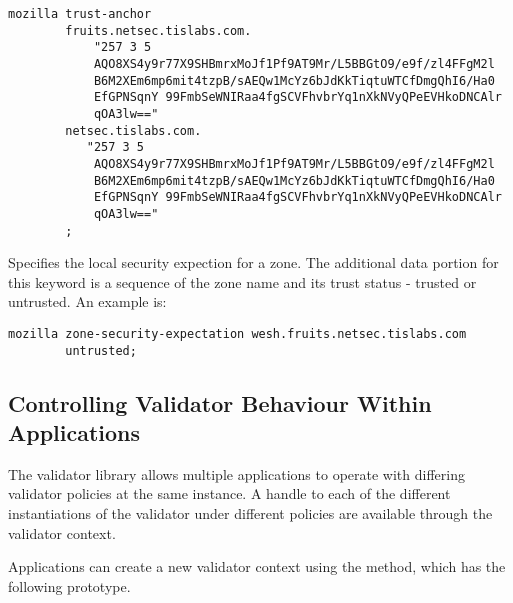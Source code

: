 \begin{itemize}
\begin{verbatim}
mozilla trust-anchor
        fruits.netsec.tislabs.com.
            "257 3 5
            AQO8XS4y9r77X9SHBmrxMoJf1Pf9AT9Mr/L5BBGtO9/e9f/zl4FFgM2l
            B6M2XEm6mp6mit4tzpB/sAEQw1McYz6bJdKkTiqtuWTCfDmgQhI6/Ha0
            EfGPNSqnY 99FmbSeWNIRaa4fgSCVFhvbrYq1nXkNVyQPeEVHkoDNCAlr
            qOA3lw=="
        netsec.tislabs.com.
           "257 3 5
            AQO8XS4y9r77X9SHBmrxMoJf1Pf9AT9Mr/L5BBGtO9/e9f/zl4FFgM2l
            B6M2XEm6mp6mit4tzpB/sAEQw1McYz6bJdKkTiqtuWTCfDmgQhI6/Ha0
            EfGPNSqnY 99FmbSeWNIRaa4fgSCVFhvbrYq1nXkNVyQPeEVHkoDNCAlr
            qOA3lw=="
        ;
\end{verbatim}
 

Specifies the local security expection for a zone. The
additional data portion for this keyword is a sequence of the
zone name and its trust status - trusted or untrusted. An
example is:

\begin{verbatim}
mozilla zone-security-expectation wesh.fruits.netsec.tislabs.com
        untrusted;
\end{verbatim}

\end{itemize}
                                                                                                                             

\subsection{Controlling Validator Behaviour Within Applications}
\label{context}
                                                                                                                             
The validator library allows multiple applications to operate
with differing validator policies at the same instance. 
A handle to each of the different instantiations of the validator
under different policies are available through the validator context.
                                                                                                                             
Applications can create a new validator context using the 
method, which has the following prototype.

